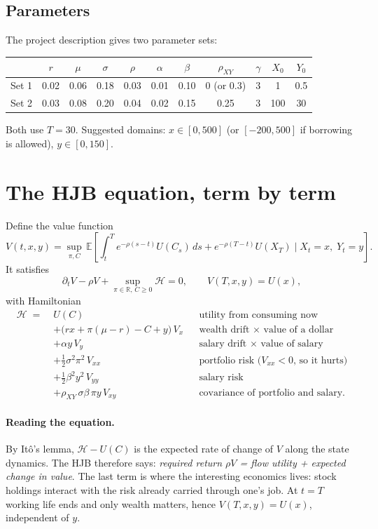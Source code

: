\documentclass[11pt]{article}
\newcommand{\E}{\mathbb{E}}
\newcommand{\rxy}{\rho_{XY}}
\begin{document}
\subsection{Parameters}
The project description gives two parameter sets:

\begin{center}
\begin{tabular}{lcccccccccc}
\toprule
 & $r$ & $\mu$ & $\sigma$ & $\rho$ & $\alpha$ & $\beta$ & $\rxy$ & $\gamma$ & $X_0$ & $Y_0$ \\
\midrule
Set 1 & 0.02 & 0.06 & 0.18 & 0.03 & 0.01 & 0.10 & 0 (or 0.3) & 3 & 1 & 0.5 \\
Set 2 & 0.03 & 0.08 & 0.20 & 0.04 & 0.02 & 0.15 & 0.25 & 3 & 100 & 30 \\
\bottomrule
\end{tabular}
\end{center}
Both use $T=30$. Suggested domains: $x\in[0,500]$ (or $[-200,500]$ if borrowing is
allowed), $y\in[0,150]$.

\section{The HJB equation, term by term}

Define the value function
\[
V(t,x,y) = \sup_{\pi,C}\,
\E\!\left[\int_t^T e^{-\rho(s-t)}U(C_s)\,ds + e^{-\rho(T-t)}U(X_T)
\;\Big|\; X_t=x,\;Y_t=y\right].
\]
It satisfies
\begin{equation}\label{eq:hjb}
\partial_t V - \rho V + \sup_{\pi\in\mathbb{R},\,C\ge0} \mathcal{H} = 0,
\qquad V(T,x,y) = U(x),
\end{equation}
with Hamiltonian
\begin{align*}
\mathcal{H} \;=\;& U(C) && \text{utility from consuming now}\\
&+ \big(rx + \pi(\mu-r) - C + y\big)\,V_x && \text{wealth drift $\times$ value of a dollar}\\
&+ \alpha y\,V_y && \text{salary drift $\times$ value of salary}\\
&+ \tfrac12\sigma^2\pi^2\,V_{xx} && \text{portfolio risk ($V_{xx}<0$, so it hurts)}\\
&+ \tfrac12\beta^2y^2\,V_{yy} && \text{salary risk}\\
&+ \rxy\,\sigma\beta\,\pi y\,V_{xy} && \text{covariance of portfolio and salary.}
\end{align*}

\paragraph{Reading the equation.}
By It\^o's lemma, $\mathcal{H}-U(C)$ is the expected rate of change of $V$ along the
state dynamics. The HJB therefore says: \emph{required return $\rho V$ = flow
utility + expected change in value}. The last term is where the interesting
economics lives: stock holdings interact with the risk already carried through
one's job. At $t=T$ working life ends and only wealth matters, hence
$V(T,x,y)=U(x)$, independent of $y$.
\end{document}
